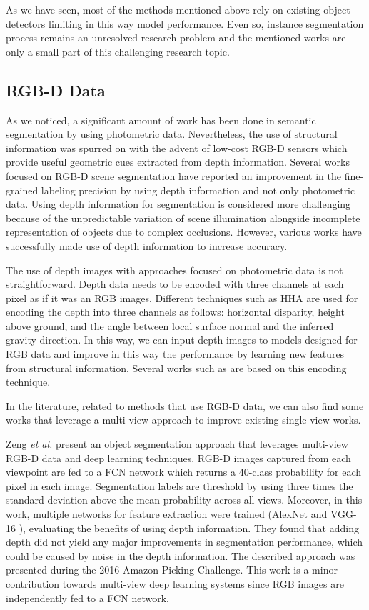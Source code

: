 As we have seen, most of the methods mentioned above rely on existing object detectors limiting in this way model performance. Even so, instance segmentation process remains an unresolved research problem and the mentioned works are only a small part of this challenging research topic. 

\subsection{\acs{RGB-D} Data}

As we noticed, a significant amount of work has been done in semantic segmentation by using photometric data. Nevertheless, the use of structural information was spurred on with the advent of low-cost \acs{RGB-D} sensors which provide useful geometric cues extracted from depth information. Several works focused on \acs{RGB-D} scene segmentation have reported an improvement in the fine-grained labeling precision by using depth information and not only photometric data. Using depth information for segmentation is considered more challenging because of the unpredictable variation of scene illumination alongside incomplete representation of objects due to complex occlusions. However, various works have successfully made use of depth information to increase accuracy.

The use of depth images with approaches focused on photometric data is not straightforward. Depth data needs to be encoded with three channels at each pixel as if it was an \acs{RGB} images. Different techniques such as \ac{HHA} \cite{Gupta2014} are used for encoding the depth into three channels as follows: horizontal disparity, height above ground, and the angle between local surface normal and the inferred gravity direction. In this way, we can input depth images to models designed for \acs{RGB} data and improve in this way the performance by learning new features from structural information. Several works such as \cite{ZhenLi2016} are based on this encoding technique.

In the literature, related to methods that use \acs{RGB-D} data, we can also find some works that leverage a multi-view approach to improve existing single-view works.

Zeng \emph{et al.}\cite{Zeng2016} present an object segmentation approach that leverages multi-view \acs{RGB-D} data and deep learning techniques. RGB-D images captured from each viewpoint are fed to a \acs{FCN} network which returns a 40-class probability for each pixel in each image. Segmentation labels are threshold by using three times the standard deviation above the mean probability across all views. Moreover, in this work, multiple networks for feature extraction were trained (AlexNet \cite{Krizhevsky2012} and \acs{VGG}-16 \cite{Simonyan2014}), evaluating the benefits of using depth information. They found that adding depth did not yield any major improvements in segmentation performance, which could be caused by noise in the depth information. The described approach was presented during the 2016 Amazon Picking Challenge. This work is a minor contribution towards multi-view deep learning systems since \acs{RGB} images are independently fed to a \acs{FCN} network.


